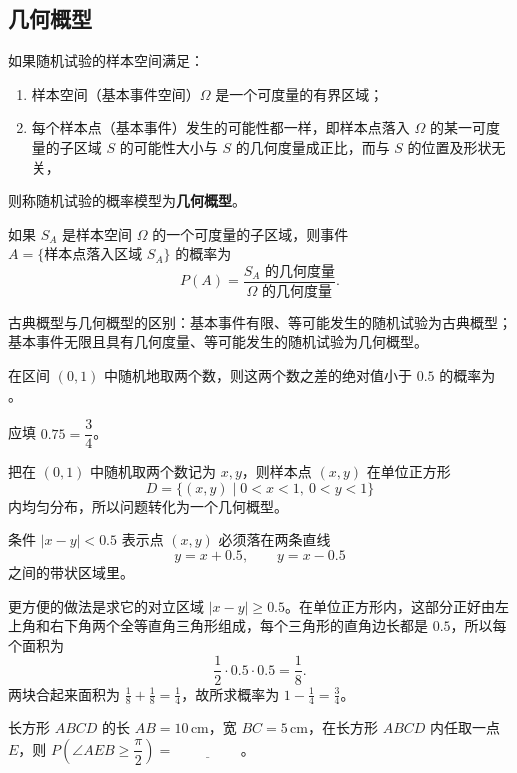 ﻿\documentclass[lang=cn,11pt]{elegantbook}
\begin{document}
\subsection{几何概型}

\begin{definition}[几何概型] \label{def:geometric-prob}
如果随机试验的样本空间满足：
\begin{enumerate}
    \item 样本空间（基本事件空间）\(\Omega\) 是一个可度量的有界区域；
    \item 每个样本点（基本事件）发生的可能性都一样，即样本点落入 \(\Omega\) 的某一可度量的子区域 \(S\) 的可能性大小与 \(S\) 的几何度量成正比，而与 \(S\) 的位置及形状无关，
\end{enumerate}
则称随机试验的概率模型为\textbf{几何概型}。
\end{definition}

如果 \(S_A\) 是样本空间 \(\Omega\) 的一个可度量的子区域，则事件 \(A = \{\text{样本点落入区域 } S_A\}\) 的概率为
\[
P(A) = \frac{S_A \text{ 的几何度量}}{\Omega \text{ 的几何度量}}.
\]

\begin{note}
古典概型与几何概型的区别：基本事件有限、等可能发生的随机试验为古典概型；基本事件无限且具有几何度量、等可能发生的随机试验为几何概型。
\end{note}

\begin{exercise}\label{exer:1-7}
在区间 \((0,1)\) 中随机地取两个数，则这两个数之差的绝对值小于 \(0.5\) 的概率为 \underline{\hspace{2cm}}。
\end{exercise}

\begin{solution}
应填 \(0.75=\dfrac34\)。

把在 \((0,1)\) 中随机取两个数记为 \(x,y\)，则样本点 \((x,y)\) 在单位正方形
\[
D=\{(x,y)\mid 0<x<1,\ 0<y<1\}
\]
内均匀分布，所以问题转化为一个几何概型。

条件 \(|x-y|<0.5\) 表示点 \((x,y)\) 必须落在两条直线
\[
y=x+0.5,\qquad y=x-0.5
\]
之间的带状区域里。

更方便的做法是求它的对立区域 \(|x-y|\ge 0.5\)。在单位正方形内，这部分正好由左上角和右下角两个全等直角三角形组成，每个三角形的直角边长都是 \(0.5\)，所以每个面积为
\[
\frac12\cdot 0.5\cdot 0.5=\frac18.
\]
两块合起来面积为 \(\frac18+\frac18=\frac14\)，故所求概率为 \(1-\frac14=\frac34\)。
\end{solution}

\begin{exercise}\label{exer:1-24}
长方形 \(ABCD\) 的长 \(AB=10\,\mathrm{cm}\)，宽 \(BC=5\,\mathrm{cm}\)，在长方形 \(ABCD\) 内任取一点 \(E\)，则 \(P\!\left(\angle AEB \ge \dfrac{\pi}{2}\right) = \underline{\hspace{2cm}}\)。
\end{exercise}
\end{document}
